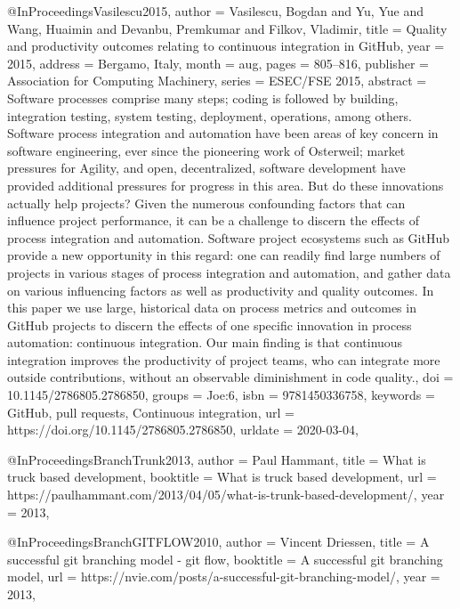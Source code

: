 {{{{{{{{@InProceedings{Vasilescu2015,
  author    = {Vasilescu, Bogdan and Yu, Yue and Wang, Huaimin and Devanbu, Premkumar and Filkov, Vladimir},
  title     = {Quality and productivity outcomes relating to continuous integration in {GitHub}},
  year      = {2015},
  address   = {Bergamo, Italy},
  month     = aug,
  pages     = {805--816},
  publisher = {Association for Computing Machinery},
  series    = {{ESEC}/{FSE} 2015},
  abstract  = {Software processes comprise many steps; coding is followed by building, integration testing, system testing, deployment, operations, among others. Software process integration and automation have been areas of key concern in software engineering, ever since the pioneering work of Osterweil; market pressures for Agility, and open, decentralized, software development have provided additional pressures for progress in this area. But do these innovations actually help projects? Given the numerous confounding factors that can influence project performance, it can be a challenge to discern the effects of process integration and automation. Software project ecosystems such as GitHub provide a new opportunity in this regard: one can readily find large numbers of projects in various stages of process integration and automation, and gather data on various influencing factors as well as productivity and quality outcomes. In this paper we use large, historical data on process metrics and outcomes in GitHub projects to discern the effects of one specific innovation in process automation: continuous integration. Our main finding is that continuous integration improves the productivity of project teams, who can integrate more outside contributions, without an observable diminishment in code quality.},
  doi       = {10.1145/2786805.2786850},
  groups    = {Joe:6},
  isbn      = {9781450336758},
  keywords  = {GitHub, pull requests, Continuous integration},
  url       = {https://doi.org/10.1145/2786805.2786850},
  urldate   = {2020-03-04},
}

@InProceedings{BranchTrunk2013},
  author    = {Paul Hammant},
  title     = {What is truck based development},
  booktitle = {What is truck based development},
  url = {https://paulhammant.com/2013/04/05/what-is-trunk-based-development/},
  year      = {2013},
}


@InProceedings{BranchGITFLOW2010},
  author    = {Vincent Driessen},
  title     = {A successful git branching model - git flow},
  booktitle = {A successful git branching model},
  url = {https://nvie.com/posts/a-successful-git-branching-model/},
  year      = {2013},
}


}}}}}}
